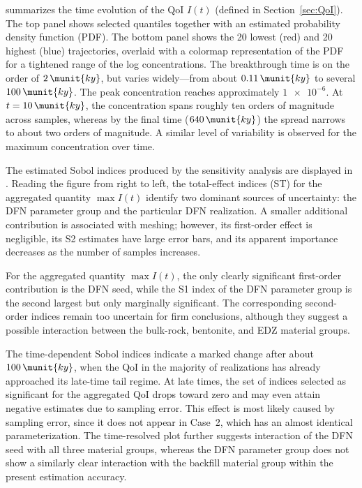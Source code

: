  summarizes the time evolution of the \gls{QoI} $I(t)$ (defined in Section~\ref{sec:QoI}). The top panel shows selected quantiles together with an estimated probability density function (PDF). The bottom panel shows the 20 lowest (red) and 20 highest (blue) trajectories, overlaid with a colormap representation of the PDF for a tightened range of the log concentrations. The breakthrough time is on the order of $2\,\munit{ky}$, but varies widely—from about $0.11\,\munit{ky}$ to several $100\,\munit{ky}$. The peak concentration reaches approximately $\num{1e-6}$. At $t=10\,\munit{ky}$, the concentration spans roughly ten orders of magnitude across samples, whereas by the final time ($640\,\munit{ky}$) the spread narrows to about two orders of magnitude. A similar level of variability is observed for the maximum concentration over time.


The estimated Sobol indices produced by the sensitivity analysis are displayed in . 
Reading the figure from right to left, the total-effect indices (ST) for the aggregated quantity $\max I(t)$ 
identify two dominant sources of uncertainty: the \gls{DFN} parameter group and the particular \gls{DFN} realization. A smaller additional contribution is associated with meshing; however, its first-order effect is negligible, its S2 estimates have large error bars, and its apparent importance decreases as the number of samples increases. 

For the aggregated quantity $\max I(t)$, the only clearly significant first-order contribution is the \gls{DFN} seed, while the S1 index of the \gls{DFN} parameter group is the second largest but only marginally significant. The corresponding second-order indices remain too uncertain for firm conclusions, although they suggest a possible interaction between the bulk-rock, bentonite, and \gls{EDZ} material groups.

The time-dependent Sobol indices indicate a marked change after about $100\,\munit{ky}$, when the \gls{QoI} in the majority of realizations has already approached its late-time tail regime. At late times, the set of indices selected as significant for the aggregated QoI drops toward zero and may even attain negative estimates due to sampling error. This effect is most likely caused by sampling error, since it does not appear in Case~2, which has an almost identical parameterization. The time-resolved plot further suggests interaction of the \gls{DFN} seed with all three material groups, whereas the \gls{DFN} parameter group does not show a similarly clear interaction with the backfill material group within the present estimation accuracy.


